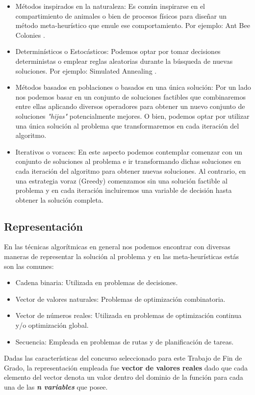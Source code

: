 \begin{itemize}
    \item Métodos inspirados en la naturaleza: Es común inspirarse en el compartimiento de animales o bien de procesos físicos para diseñar un método meta-heurístico que emule ese comportamiento. Por ejemplo: Ant Bee Colonies \cite{Mann2017}.
    \item Determinísticos o Estocásticos: Podemos optar por tomar decisiones deterministas o emplear reglas aleatorias durante la búsqueda de nuevas soluciones. Por ejemplo: Simulated Annealing \cite{SA1}.
    \item Métodos basados en poblaciones o basados en una única solución: Por un lado nos podemos basar en un conjunto de soluciones factibles que combinaremos entre ellas aplicando diversos operadores para obtener un  nuevo conjunto de soluciones \textit{"hijas"} potencialmente mejores. O bien, podemos optar por utilizar una única solución al problema que transformaremos en cada iteración del algoritmo.
    \item Iterativos o voraces: En este aspecto podemos contemplar comenzar con un conjunto de soluciones al problema e ir transformando dichas soluciones en cada iteración del algoritmo para obtener nuevas soluciones. Al contrario, en una estrategia voraz (Greedy) comenzamos sin una solución factible al problema y en cada iteración incluiremos una variable de decisión hasta obtener la solución completa.
\end{itemize}

\subsection{Representación}

En las técnicas algorítmicas en general nos podemos encontrar con diversas maneras de representar la solución al problema y en las meta-heurísticas estás son las comunes\cite{metaheuristics}:

\bigskip

\begin{itemize}
    \item Cadena binaria: Utilizada en problemas de decisiones. 
    \item Vector de valores naturales: Problemas de optimización combinatoria.
    \item Vector de números reales: Utilizada en problemas de optimización continua y/o optimización global.
    \item Secuencia: Empleada en problemas de rutas y de planificación de tareas.
\end{itemize}

Dadas las características del concurso seleccionado para este Trabajo de Fin de Grado, la representación empleada fue \textbf{vector de valores reales} dado que cada elemento del vector denota un valor dentro del dominio de la función para cada una de las \textbf{\textit{n variables}} que posee.
